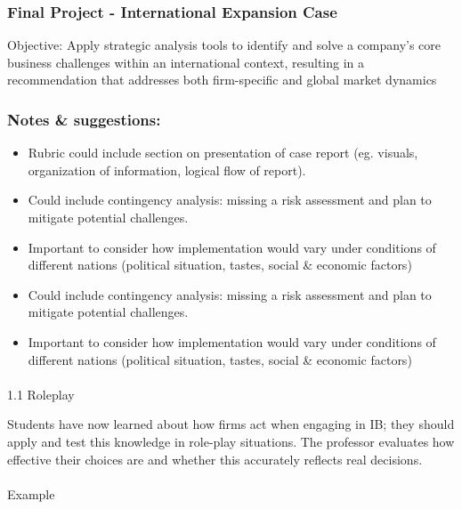 \documentclass[
  11pt,
]{article}
\makeatletter
\let\oldparagraph\paragraph
\renewcommand{\paragraph}{
    \@ifstar
      \xxxParagraphStar
      \xxxParagraphNoStar
  }
\newcommand{\xxxParagraphStar}[1]{\oldparagraph*{#1}\mbox{}}
\newcommand{\xxxParagraphNoStar}[1]{\oldparagraph{#1}\mbox{}}
\providecommand{\tightlist}{%
  \setlength{\itemsep}{0pt}\setlength{\parskip}{0pt}}
\makeatother
\begin{document}
\subsubsection{Final Project - International Expansion
Case}\label{final-project---international-expansion-case}

Objective: Apply strategic analysis tools to identify and solve a
company's core business challenges within an international context,
resulting in a recommendation that addresses both firm-specific and
global market dynamics

\subsubsection{Notes \& suggestions:}\label{notes-suggestions}

\begin{itemize}
\tightlist
\item
  Rubric could include section on presentation of case report (eg.
  visuals, organization of information, logical flow of report).
\item
  Could include contingency analysis: missing a risk assessment and plan
  to mitigate potential challenges.
\item
  Important to consider how implementation would vary under conditions
  of different nations (political situation, tastes, social \& economic
  factors)
\item
  Could include contingency analysis: missing a risk assessment and plan
  to mitigate potential challenges.
\item
  Important to consider how implementation would vary under conditions
  of different nations (political situation, tastes, social \& economic
  factors)
\end{itemize}

\paragraph{1.1 Roleplay}\label{roleplay-1}

Students have now learned about how firms act when engaging in IB; they
should apply and test this knowledge in role-play situations. The
professor evaluates how effective their choices are and whether this
accurately reflects real decisions.

\paragraph{Example}\label{example}
\end{document}
